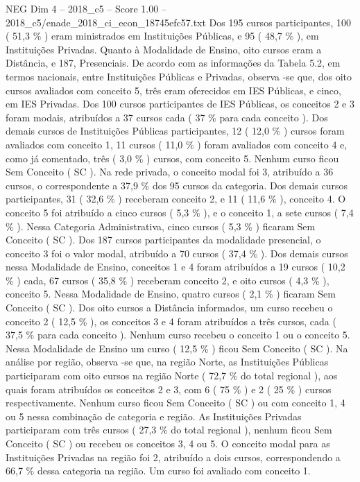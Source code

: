 \begin{textsample}{NEG Dim 4 – 2018\_c5 – Score 1.00 – 2018\_c5/enade\_2018\_ci\_econ\_18745efc57.txt}
Dos 195 cursos participantes, 100 ( 51,3 \% ) eram ministrados em Instituições Públicas, e 95 ( 48,7 \% ), em Instituições Privadas.
Quanto à Modalidade de Ensino, oito cursos eram a Distância, e 187, Presenciais.
De acordo com as informações da Tabela 5.2, em termos nacionais, entre Instituições Públicas e Privadas, observa -se que, dos oito cursos avaliados com conceito 5, três eram oferecidos em IES Públicas, e cinco, em IES Privadas.
Dos 100 cursos participantes de IES Públicas, os conceitos 2 e 3 foram modais, atribuídos a 37 cursos cada ( 37 \% para cada conceito ).
Dos demais cursos de Instituições Públicas participantes, 12 ( 12,0 \% ) cursos foram avaliados com conceito 1, 11 cursos ( 11,0 \% ) foram avaliados com conceito 4 e, como já comentado, três ( 3,0 \% ) cursos, com conceito 5.
Nenhum curso ficou Sem Conceito ( SC ).
Na rede privada, o conceito modal foi 3, atribuído a 36 cursos, o correspondente a 37,9 \% dos 95 cursos da categoria.
Dos demais cursos participantes, 31 ( 32,6 \% ) receberam conceito 2, e 11 ( 11,6 \% ), conceito 4.
O conceito 5 foi atribuído a cinco cursos ( 5,3 \% ), e o conceito 1, a sete cursos ( 7,4 \% ).
Nessa Categoria Administrativa, cinco cursos ( 5,3 \% ) ficaram Sem Conceito ( SC ).
Dos 187 cursos participantes da modalidade presencial, o conceito 3 foi o valor modal, atribuído a 70 cursos ( 37,4 \% ).
Dos demais cursos nessa Modalidade de Ensino, conceitos 1 e 4 foram atribuídos a 19 cursos ( 10,2 \% ) cada, 67 cursos ( 35,8 \% ) receberam conceito 2, e oito cursos ( 4,3 \% ), conceito 5.
Nessa Modalidade de Ensino, quatro cursos ( 2,1 \% ) ficaram Sem Conceito ( SC ).
Dos oito cursos a Distância informados, um curso recebeu o conceito 2 ( 12,5 \% ), os conceitos 3 e 4 foram atribuídos a três cursos, cada ( 37,5 \% para cada conceito ).
Nenhum curso recebeu o conceito 1 ou o conceito 5.
Nessa Modalidade de Ensino um curso ( 12,5 \% ) ficou Sem Conceito ( SC ).
Na análise por região, observa -se que, na região Norte, as Instituições Públicas participaram com oito cursos na região Norte ( 72,7 \% do total regional ), aos quais foram atribuídos os conceitos 2 e 3, com 6 ( 75 \% ) e 2 ( 25 \% ) cursos respectivamente.
Nenhum curso ficou Sem Conceito ( SC ) ou com conceito 1, 4 ou 5 nessa combinação de categoria e região.
As Instituições Privadas participaram com três cursos ( 27,3 \% do total regional ), nenhum ficou Sem Conceito ( SC ) ou recebeu os conceitos 3, 4 ou 5.
O conceito modal para as Instituições Privadas na região foi 2, atribuído a dois cursos, correspondendo a 66,7 \% dessa categoria na região.
Um curso foi avaliado com conceito 1.

\end{textsample}
